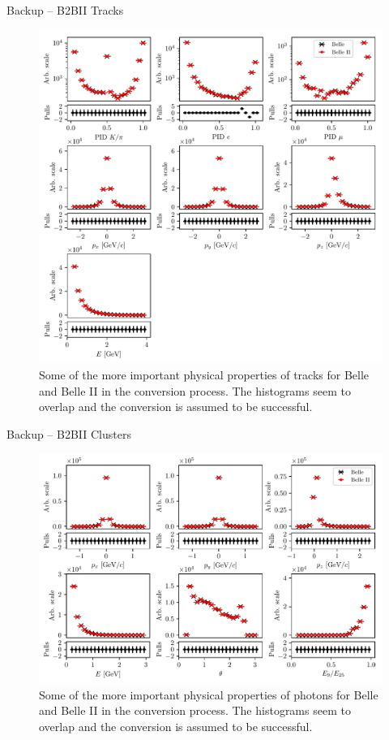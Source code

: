 \documentclass[serif]{beamer}
\begin{document}
\begin{frame}[t]{Backup -- B2BII Tracks}
\vspace{-3mm}
\small
\begin{figure}[H]
	\centering
	\includegraphics[width=0.5\linewidth]{fig/b2bii_tracks}
	\caption{Some of the more important physical properties of tracks for Belle and Belle II in the conversion process. The histograms seem to overlap and the conversion is assumed to be successful.}
	\label{fig:b2bii_tracks}
\end{figure}
\end{frame}

\begin{frame}[t]{Backup -- B2BII Clusters}
\vspace{-3mm}
\small
\begin{figure}[H]
	\centering
	\includegraphics[width=\linewidth]{fig/b2bii_gammas}
	\caption{Some of the more important physical properties of photons for Belle and Belle II in the conversion process. The histograms seem to overlap and the conversion is assumed to be successful.}
	\label{fig:b2bii_gammas}
\end{figure}
\end{frame}
\end{document}
